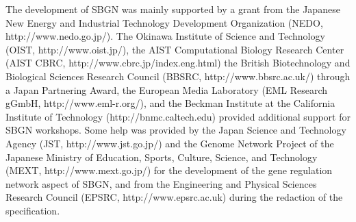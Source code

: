 The development of SBGN was mainly supported by a grant from the Japanese New Energy and Industrial Technology Development Organization (NEDO, http://www.nedo.go.jp/). The Okinawa Institute of Science and Technology (OIST, http://www.oist.jp/), the AIST Computational Biology Research Center (AIST CBRC, http://www.cbrc.jp/index.eng.html) the British Biotechnology and Biological Sciences Research Council (BBSRC, http://www.bbsrc.ac.uk/) through a Japan Partnering Award, the European Media Laboratory (EML Research gGmbH, http://www.eml-r.org/), and the Beckman Institute at the California Institute of Technology (http://bnmc.caltech.edu) provided additional support for SBGN workshops. Some help was provided by the Japan Science and Technology Agency (JST, http://www.jst.go.jp/) and the Genome Network Project of the Japanese Ministry of Education, Sports, Culture, Science, and Technology (MEXT, http://www.mext.go.jp/) for the development of the gene regulation network aspect of SBGN, and from the Engineering and Physical Sciences Research Council (EPSRC, http://www.epsrc.ac.uk) during the redaction of the specification.

